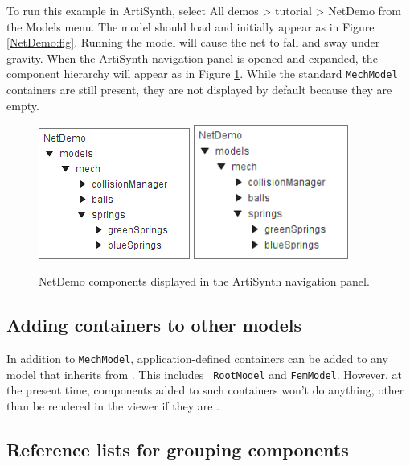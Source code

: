 To run this example in ArtiSynth, select {\sf All demos > tutorial >
NetDemo} from the {\sf Models} menu. The model should load and
initially appear as in Figure \ref{NetDemo:fig}.  Running the model
will cause the net to fall and sway under gravity. When the ArtiSynth
navigation panel is opened and expanded, the component hierarchy will
appear as in Figure \ref{NetDemoNav:fig}. While the standard
{\tt MechModel} containers are still present, they are not displayed
by default because they are empty.

\begin{figure}[ht]
\begin{center}
\iflatexml
 \includegraphics[]{images/NetDemoNav}
\else
 \includegraphics[width=2in]{images/NetDemoNav}
\fi
\end{center}
\caption{NetDemo components displayed in the ArtiSynth navigation panel.}
\label{NetDemoNav:fig}
\end{figure}

\subsection{Adding containers to other models}

In addition to {\tt MechModel}, application-defined containers can be
added to any model that inherits from
. This includes {\tt
RootModel} and {\tt FemModel}. However, at the present time,
components added to such containers won't do anything, other than be
rendered in the viewer if they are
.

\subsection{Reference lists for grouping components}

